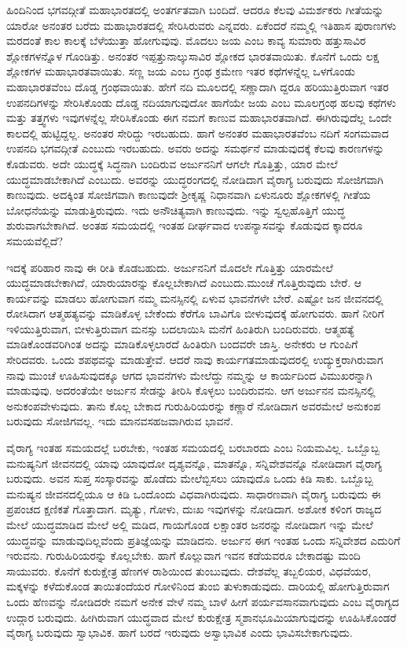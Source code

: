 ಹಿಂದಿನಿಂದ ಭಗವದ್ಗೀತೆ ಮಹಾಭಾರತದಲ್ಲಿ ಅಂತರ್ಗತವಾಗಿ ಬಂದಿದೆ. ಆದರೂ ಕೆಲವು ವಿಮರ್ಶಕರು ಗೀತೆಯನ್ನು ಯಾರೋ ಅನಂತರ ಬರೆದು ಮಹಾಭಾರತದಲ್ಲಿ ಸೇರಿಸಿರುವರು ಎನ್ನವರು. ಏಕೆಂದರೆ ನಮ್ಮಲ್ಲಿ ಇತಿಹಾಸ ಪುರಾಣಗಳು ಮರದಂತೆ ಕಾಲ ಕಾಲಕ್ಕೆ ಬೆಳೆಯುತ್ತಾ ಹೋಗುವುವು. ಮೊದಲು ಜಯ ಎಂಬ ಕಾವ್ಯ ಸುಮಾರು ಹತ್ತುಸಾವಿರ ಶ್ಲೋಕಗಳನ್ನೊಳ ಗೊಂಡಿತ್ತು. ಅನಂತರ ಇಪ್ಪತ್ತುನಾಲ್ಕುಸಾವಿರ ಶ್ಲೋಕದ ಭಾರತವಾಯಿತು. ಕೊನೆಗೆ ಒಂದು ಲಕ್ಷ ಶ್ಲೋಕಗಳ ಮಹಾಭಾರತವಾಯಿತು. ಸಣ್ಣ ಜಯ ಎಂಬ ಗ್ರಂಥ ಕ್ರಮೇಣ ಇತರ ಕಥೆಗಳನ್ನೆಲ್ಲ ಒಳಗೊಂಡು ಮಹಾಭಾರತವೆಂಬ ದೊಡ್ಡ ಗ್ರಂಥವಾಯಿತು. ಹೇಗೆ ನದಿ ಮೂಲದಲ್ಲಿ ಸಣ್ಣಾದಾಗಿ ದ್ದರೂ ಹರಿಯುತ್ತಿರುವಾಗ ಇತರ ಉಪನದಿಗಳನ್ನು ಸೇರಿಸಿಕೊಂಡು ದೊಡ್ಡ ನದಿಯಾಗುವುದೋ ಹಾಗೆಯೇ ಜಯ ಎಂಬ ಮೂಲಗ್ರಂಥ ಹಲವು ಕಥೆಗಳು ಮತ್ತು ತತ್ತ್ವಗಳು ಇವುಗಳನ್ನೆಲ್ಲ ಸೇರಿಸಿಕೊಂಡು ಈಗ ನಮಗೆ ಕಾಣುವ ಮಹಾಭಾರತವಾಗಿದೆ. ಈಗಿರುವುದೆಲ್ಲ ಒಂದೇ ಕಾಲದಲ್ಲಿ ಹುಟ್ಟಿದ್ದಲ್ಲ. ಅನಂತರ ಸೇರಿದ್ದು ಇರಬಹುದು. ಹಾಗೆ ಅನಂತರ ಮಹಾಭಾರತವೆಂಬ ನದಿಗೆ ಸಂಗಮವಾದ ಉಪನದಿ ಭಗವದ್ಗೀತೆ ಎಂಬುದು ಇರಬಹುದು. ಅವರು ಅದನ್ನು ಸಮರ್ಥನೆ ಮಾಡುವುದಕ್ಕೆ ಕೆಲವು ಕಾರಣಗಳನ್ನು ಕೊಡುವರು. ಅದೇ ಯುದ್ಧಕ್ಕೆ ಸಿದ್ಧನಾಗಿ ಬಂದಿರುವ ಅರ್ಜುನನಿಗೆ ಆಗಲೇ ಗೊತ್ತಿತ್ತು, ಯಾರ ಮೇಲೆ ಯುದ್ಧಮಾಡಬೇಕಾಗಿದೆ ಎಂಬುದು. ಅವರನ್ನು ಯುದ್ಧರಂಗದಲ್ಲಿ ನೋಡಿದಾಗ ವೈರಾಗ್ಯ ಬರುವುದು ಸೋಜಿಗವಾಗಿ ಕಾಣುವುದು. ಅದಕ್ಕಿಂತ ಸೋಜಿಗವಾಗಿ ಕಾಣುವುದೇ ಶ‍್ರೀಕೃಷ್ಣ ನಿಧಾನವಾಗಿ ಏಳುನೂರು ಶ್ಲೋಕಗಳಲ್ಲಿ ಗೀತೆಯ ಬೋಧನೆಯನ್ನು ಮಾಡುತ್ತಿರುವುದು. ಇದು ಅನೌಚಿತ್ಯವಾಗಿ ಕಾಣುವುದು. ಇನ್ನು ಸ್ವಲ್ಪಹೊತ್ತಿಗೆ ಯುದ್ಧ ಶುರುವಾಗಬೇಕಾಗಿದೆ. ಅಂತಹ ಸಮಯದಲ್ಲಿ ಇಂತಹ ದೀರ್ಘವಾದ ಉಪನ್ಯಾಸವನ್ನು ಕೊಡುವುದ ಕ್ಕಾದರೂ ಸಮಯವೆಲ್ಲಿದೆ?

ಇದಕ್ಕೆ ಪರಿಹಾರ ನಾವು ಈ ರೀತಿ ಕೊಡಬಹುದು. ಅರ್ಜುನನಿಗೆ ಮೊದಲೇ ಗೊತ್ತಿತ್ತು ಯಾರಮೇಲೆ ಯುದ್ಧಮಾಡಬೇಕಾಗಿದೆ, ಯಾರುಯಾರನ್ನು ಕೊಲ್ಲಬೇಕಾಗಿದೆ ಎಂಬುದು.\break ಮುಂಚೆ ಗೊತ್ತಿರುವುದು ಬೇರೆ. ಆ ಕಾರ್ಯವನ್ನು ಮಾಡಲು ಹೋಗುವಾಗ ನಮ್ಮ ಮನಸ್ಸಿನಲ್ಲಿ ಏಳುವ ಭಾವನೆಗಳೇ ಬೇರೆ. ಎಷ್ಟೋ ಜನ ಜೀವನದಲ್ಲಿ ರೋಸಿದಾಗ ಆತ್ಮಹತ್ಯವನ್ನು ಮಾಡಿಕೊಳ್ಳ ಬೇಕೆಂದು ಕೆರೆಗೊ ಬಾವಿಗೊ ಬೀಳುವುದಕ್ಕೆ ಹೋಗುವರು. ಹಾಗೆ ನೀರಿಗೆ ಇಳಿಯುತ್ತಿರುವಾಗ, ಬೀಳುತ್ತಿರುವಾಗ ಮನಸ್ಸು ಬದಲಾಯಿಸಿ ಮನೆಗೆ ಹಿಂತಿರುಗಿ ಬಂದಿರುವರು. ಆತ್ಮಹತ್ಯೆ ಮಾಡಿಕೊಂಡವರಿಗಿಂತ ಅದನ್ನು ಮಾಡಿಕೊಳ್ಳಲಾರದೆ ಹಿಂತಿರುಗಿ ಬಂದವರೇ ಜಾಸ್ತಿ. ಅನೇಕರು ಆ ಗುಂಪಿಗೆ ಸೇರಿದವರು. ಒಂದು ಶಪಥವನ್ನು ಮಾಡುತ್ತೇವೆ. ಆದರೆ ನಾವು ಕಾರ್ಯಗತಮಾಡುವುದರಲ್ಲಿ ಉದ್ಯುಕ್ತರಾಗಿರುವಾಗ ನಾವು ಮುಂಚೆ ಊಹಿಸುವುದಕ್ಕೂ ಆಗದ ಭಾವನೆಗಳು ಮೇಲೆದ್ದು ನಮ್ಮನ್ನು ಆ ಕಾರ್ಯದಿಂದ ವಿಮುಖರನ್ನಾಗಿ ಮಾಡುವುವು. ಅದರಂತೆಯೇ ಅರ್ಜುನ ಸೇಡನ್ನು ತೀರಿಸಿ ಕೊಳ್ಳಲು ಬಂದಿರುವನು. ಆಗ ಅರ್ಜುನನ ಮನಸ್ಸಿನಲ್ಲಿ ಅನುಕಂಪವೇಳುವುದು. ತಾನು ಕೊಲ್ಲ ಬೇಕಾದ ಗುರುಹಿರಿಯರನ್ನು ಕಣ್ಣಾರೆ ನೋಡಿದಾಗ ಅವರಮೇಲೆ ಅನುಕಂಪ ಬರುವುದು ಸೋಜಿಗವಲ್ಲ. ಇದು ಮಾನವಸಹಜವಾಗಿರುವ ಭಾವನೆ.

ವೈರಾಗ್ಯ ಇಂತಹ ಸಮಯದಲ್ಲೆ ಬರಬೇಕು, ಇಂತಹ ಸಮಯದಲ್ಲಿ ಬರಬಾರದು ಎಂಬ ನಿಯಮವಿಲ್ಲ. ಒಬ್ಬೊಬ್ಬ ಮನುಷ್ಯನಿಗೆ ಜೀವನದಲ್ಲಿ ಯಾವು ಯಾವುದೋ ದೃಶ್ಯವನ್ನೊ, ಮಾತನ್ನೊ, ಸನ್ನಿವೇಶವನ್ನೊ ನೋಡಿದಾಗ ವೈರಾಗ್ಯ ಬರುವುದು. ಅವನ ಸುಪ್ತ ಸಂಸ್ಕಾರವನ್ನು ಹೊಡೆದು ಮೇಲೆಬ್ಬಿಸಲು ಯಾವುದೊ ಒಂದು ಕಿಡಿ ಸಾಕು. ಒಬ್ಬೊಬ್ಬ ಮನುಷ್ಯನ ಜೀವನದಲ್ಲಿಯೂ ಆ ಕಿಡಿ ಒಂದೊಂದು ವಿಧವಾಗಿರುವುದು. ಸಾಧಾರಣವಾಗಿ ವೈರಾಗ್ಯ ಬರುವುದು ಈ ಪ್ರಪಂಚದ ಕ್ಷಣಿಕತೆ ಗೊತ್ತಾದಾಗ. ಮೃತ್ಯು, ಗೋಳು, ದುಃಖ ಇವುಗಳನ್ನು ನೋಡಿದಾಗ. ಅಶೋಕ ಕಳಿಂಗ ರಾಜ್ಯದ ಮೇಲೆ ಯುದ್ಧಮಾಡಿದ ಮೇಲೆ ಅಲ್ಲಿ ಮಡಿದ, ಗಾಯಗೊಂಡ ಲಕ್ಷಾಂತರ ಜನರನ್ನು ನೋಡಿದಾಗ ಇನ್ನು ಮೇಲೆ ಯುದ್ಧವನ್ನು ಮಾಡುವುದಿಲ್ಲವೆಂದು ಪ್ರತಿಜ್ಞೆಯನ್ನು ಮಾಡಿದನು. ಅರ್ಜುನ ಈಗ ಇಂತಹ ಒಂದು ಸನ್ನಿವೇಶದ ಎದುರಿಗೆ ಇರುವನು. ಗುರುಹಿರಿಯರನ್ನು ಕೊಲ್ಲಬೇಕು. ಹಾಗೆ ಕೊಲ್ಲುವಾಗ ಇವನ ಕಡೆಯವರೂ ಬೇಕಾದಷ್ಟು ಮಂದಿ ಸಾಯುವರು. ಕೊನೆಗೆ ಕುರುಕ್ಷೇತ್ರ ಹೆಣಗಳ ರಾಶಿಯಿಂದ ತುಂಬುವುದು. ದೇಶವೆಲ್ಲ ತಬ್ಬಲಿಯರ, ವಿಧವೆಯರ, ಮಕ್ಕಳನ್ನು ಕಳೆದುಕೊಂಡ ತಾಯಿತಂದೆಯರ ಗೋಳಿನಿಂದ ತುಂಬಿ ತುಳುಕಾಡುವುದು. ದಾರಿಯಲ್ಲಿ ಹೋಗುತ್ತಿರುವಾಗ ಒಂದು ಹೆಣವನ್ನು ನೋಡಿದರೇ ನಮಗೆ ಅನೇಕ ವೇಳೆ ನಮ್ಮ ಬಾಳೆ ಹೀಗೆ ಪರ್ಯವಸಾನವಾಗುವುದು ಎಂಬ ವೈರಾಗ್ಯದ ಉದ್ಗಾರ ಬರುವುದು. ಹೀಗಿರುವಾಗ ಯುದ್ಧವಾದ ಮೇಲೆ ಕುರುಕ್ಷೇತ್ರ ಸ್ಮಶಾನಭೂಮಿಯಾಗುವುದನ್ನು ಊಹಿಸಿಕೊಂಡರೆ ವೈರಾಗ್ಯ ಬರುವುದು ಸ್ವಾಭಾವಿಕ. ಹಾಗೆ ಬರದೆ ಇರುವುದು ಅಸ್ವಾಭಾವಿಕ ಎಂದು ಭಾವಿಸಬೇಕಾಗುವುದು.

